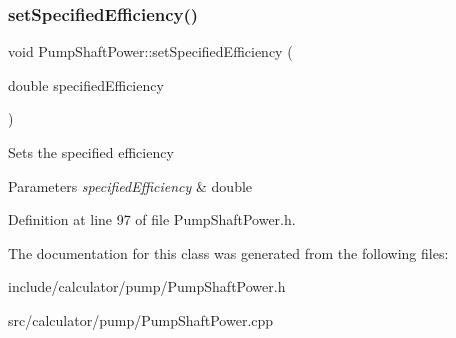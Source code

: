 \subsubsection{\texorpdfstring{set\+Specified\+Efficiency()}{setSpecifiedEfficiency()}}
{\footnotesize\ttfamily void Pump\+Shaft\+Power\+::set\+Specified\+Efficiency (\begin{DoxyParamCaption}\item[{double}]{specified\+Efficiency }\end{DoxyParamCaption})\hspace{0.3cm}{\ttfamily [inline]}}

Sets the specified efficiency 
\begin{DoxyParams}{Parameters}
{\em specified\+Efficiency} & double \\
\hline
\end{DoxyParams}


Definition at line 97 of file Pump\+Shaft\+Power.\+h.



The documentation for this class was generated from the following files\+:\begin{DoxyCompactItemize}
\item 
include/calculator/pump/Pump\+Shaft\+Power.\+h\item 
src/calculator/pump/Pump\+Shaft\+Power.\+cpp\end{DoxyCompactItemize}
